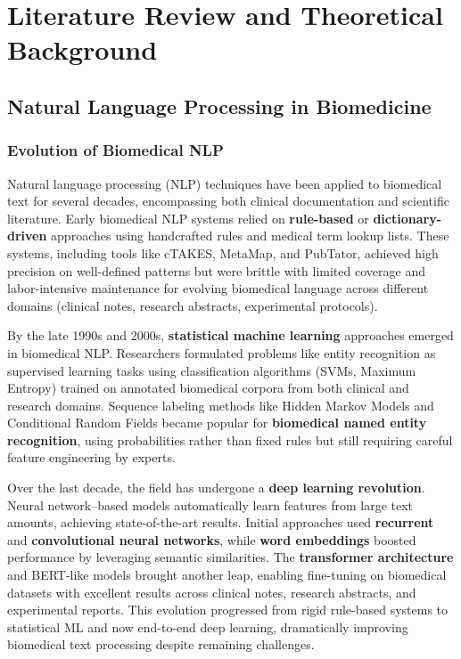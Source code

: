 
\chapter{Literature Review and Theoretical Background}
\label{chap:literature}

\section{Natural Language Processing in Biomedicine}

\subsection{Evolution of Biomedical NLP}

Natural language processing (NLP) techniques have been applied to biomedical text for several decades, encompassing both clinical documentation and scientific literature. Early biomedical NLP systems relied on \textbf{rule-based} or \textbf{dictionary-driven} approaches using handcrafted rules and medical term lookup lists. These systems, including tools like cTAKES, MetaMap, and PubTator, achieved high precision on well-defined patterns but were brittle with limited coverage and labor-intensive maintenance for evolving biomedical language across different domains (clinical notes, research abstracts, experimental protocols).

By the late 1990s and 2000s, \textbf{statistical machine learning} approaches emerged in biomedical NLP. Researchers formulated problems like entity recognition as supervised learning tasks using classification algorithms (SVMs, Maximum Entropy) trained on annotated biomedical corpora from both clinical and research domains. Sequence labeling methods like Hidden Markov Models and Conditional Random Fields became popular for \textbf{biomedical named entity recognition}, using probabilities rather than fixed rules but still requiring careful feature engineering by experts.

Over the last decade, the field has undergone a \textbf{deep learning revolution}. Neural network–based models automatically learn features from large text amounts, achieving state-of-the-art results. Initial approaches used \textbf{recurrent} and \textbf{convolutional neural networks}, while \textbf{word embeddings} boosted performance by leveraging semantic similarities. The \textbf{transformer architecture} and BERT-like models brought another leap, enabling fine-tuning on biomedical datasets with excellent results across clinical notes, research abstracts, and experimental reports. This evolution progressed from rigid rule-based systems to statistical ML and now end-to-end deep learning, dramatically improving biomedical text processing despite remaining challenges.

